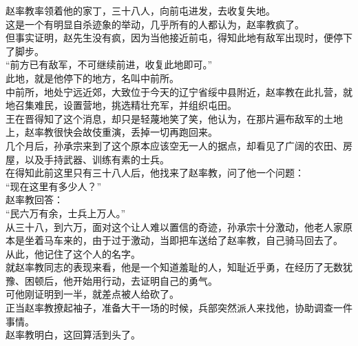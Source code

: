 \begin{multicols}{\theparacolNo}
赵率教率领着他的家丁，三十八人，向前屯进发，去收复失地。\\

这是一个有明显自杀迹象的举动，几乎所有的人都认为，赵率教疯了。\\

但事实证明，赵先生没有疯，因为当他接近前屯，得知此地有敌军出现时，便停下了脚步。\\

“前方已有敌军，不可继续前进，收复此地即可。”\\

此地，就是他停下的地方，名叫中前所。\\

中前所，地处宁远近郊，大致位于今天的辽宁省绥中县附近，赵率教在此扎营，就地召集难民，设置营地，挑选精壮充军，并组织屯田。\\

王在晋得知了这个消息，却只是轻蔑地笑了笑，他认为，在那片遍布敌军的土地上，赵率教很快会故伎重演，丢掉一切再跑回来。\\

几个月后，孙承宗来到了这个原本应该空无一人的据点，却看见了广阔的农田、房屋，以及手持武器、训练有素的士兵。\\

在得知此前这里只有三十八人后，他找来了赵率教，问了他一个问题：\\

“现在这里有多少人？”\\

赵率教回答：\\

“民六万有余，士兵上万人。”\\

从三十八，到六万，面对这个让人难以置信的奇迹，孙承宗十分激动，他老人家原本是坐着马车来的，由于过于激动，当即把车送给了赵率教，自己骑马回去了。\\

从此，他记住了这个人的名字。\\

就赵率教同志的表现来看，他是一个知道羞耻的人，知耻近乎勇，在经历了无数犹豫、困顿后，他开始用行动，去证明自己的勇气。\\

可他刚证明到一半，就差点被人给砍了。\\

正当赵率教撩起袖子，准备大干一场的时候，兵部突然派人来找他，协助调查一件事情。\\

赵率教明白，这回算活到头了。\\


\end{multicols}
